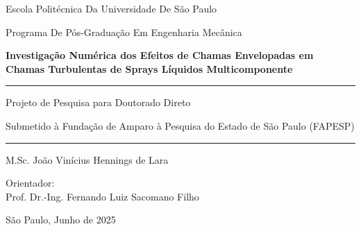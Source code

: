 \begin{titlepage}
    \centering
    \large
    {
    Escola Politécnica Da Universidade De São Paulo \par
    Programa De Pós-Graduação Em Engenharia Mecânica
    \par}

    \vspace*{5cm}
    
    {\bfseries\Large
    Investigação Numérica dos Efeitos de Chamas Envelopadas em Chamas Turbulentas de Sprays Líquidos Multicomponente\par}
    
    \vspace{2cm}

    \hrule
    \vspace{0.4cm}
    {
    Projeto de Pesquisa para Doutorado Direto\par
    Submetido à Fundação de Amparo à Pesquisa do Estado de São Paulo (FAPESP)
    }    
    \vspace{0.4cm}
    \hrule
    
    \vspace{3cm}
    {
    M.Sc. João Vinícius Hennings de Lara\par
    }
    
    \vspace{1.5cm}
    {
    Orientador:\\ Prof. Dr.-Ing. Fernando Luiz Sacomano Filho
    }
    
    \vfill
    São Paulo, Junho de 2025

\end{titlepage}
